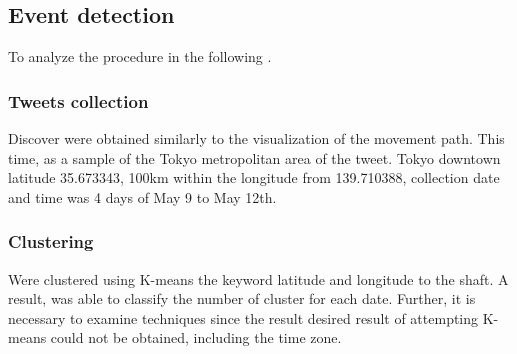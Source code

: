 \subsection{Event detection}
To analyze the procedure in the following .


\subsubsection{Tweets collection}
Discover were obtained similarly to the visualization of the movement path. This time, as a sample of the Tokyo metropolitan area of the tweet. Tokyo downtown latitude 35.673343, 100km within the longitude from 139.710388, collection date and time was 4 days of May 9 to May 12th.

\subsubsection{Clustering}
Were clustered using K-means the keyword latitude and longitude to the shaft.
A result, was able to classify the number of cluster  for each date.
Further, it is necessary to examine techniques since the result desired result of attempting K-means could not be obtained, including the time zone.


